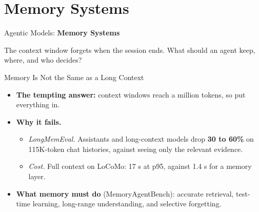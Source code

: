 \section{Memory Systems}

\begin{frame}{}
    \LARGE Agentic Models: \textbf{Memory Systems}

    \vspace{1em}
    \normalsize The context window forgets when the session ends. What should an agent keep, where, and who decides?
\end{frame}

\begin{frame}{Memory Is Not the Same as a Long Context}
    \begin{itemize}\itemsep0.5em
        \item \textbf{The tempting answer:} context windows reach a million tokens, so put everything in.
        \item \textbf{Why it fails.}
        \begin{itemize}\itemsep0.25em
            \item \emph{LongMemEval.} Assistants and long-context models drop \textbf{30 to 60\%} on 115K-token chat histories, against seeing only the relevant evidence.
            \item \emph{Cost.} Full context on LoCoMo: 17 s at p95, against 1.4 s for a memory layer.
        \end{itemize}
        \item \textbf{What memory must do} (MemoryAgentBench): accurate retrieval, test-time learning, long-range understanding, and \alert{selective forgetting}.
    \end{itemize}
    \vspace{0.3em}
\end{frame}


